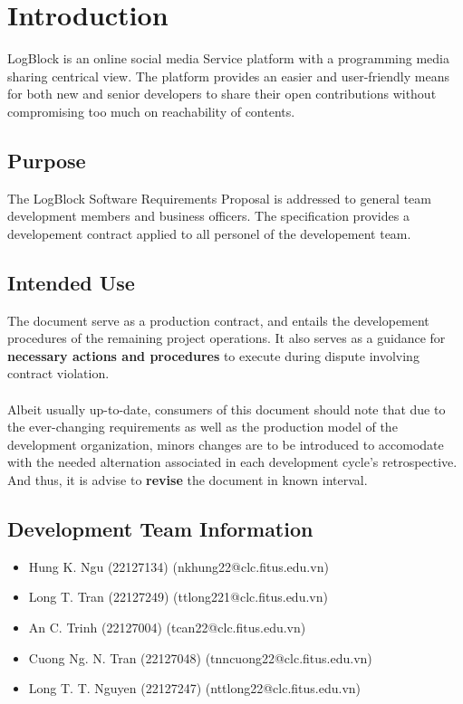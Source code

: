 \chapter{Introduction}

LogBlock is an online social media Service platform with a programming media sharing centrical view. The platform provides an easier and user-friendly means 
for both new and senior developers to share their open contributions without compromising too much on reachability of contents.

    \section{Purpose}
    The LogBlock Software Requirements Proposal is addressed to general team development members and business officers. 
    The specification provides a developement contract applied to all personel of the developement team.

    \section{Intended Use}
    The document serve as a production contract, and entails the developement procedures of the remaining project operations.
    It also serves as a guidance for \textbf{necessary actions and procedures} to execute during dispute involving contract violation.
    \\\\
    Albeit usually up-to-date, consumers of this document should note that due to the ever-changing requirements as 
    well as the production model of the development organization, minors changes are to be introduced to accomodate with the needed alternation associated in each 
    development cycle's retrospective. And thus, it is advise to \textbf{revise} the document in known interval.

    \section{Development Team Information}
    \begin{itemize}
        \item Hung K. Ngu (22127134) (nkhung22@clc.fitus.edu.vn)
        \item Long T. Tran (22127249) (ttlong221@clc.fitus.edu.vn)
        \item An C. Trinh (22127004) (tcan22@clc.fitus.edu.vn)
        \item Cuong Ng. N. Tran (22127048) (tnncuong22@clc.fitus.edu.vn)
        \item Long T. T. Nguyen (22127247) (nttlong22@clc.fitus.edu.vn) 
    \end{itemize}
\newpage

